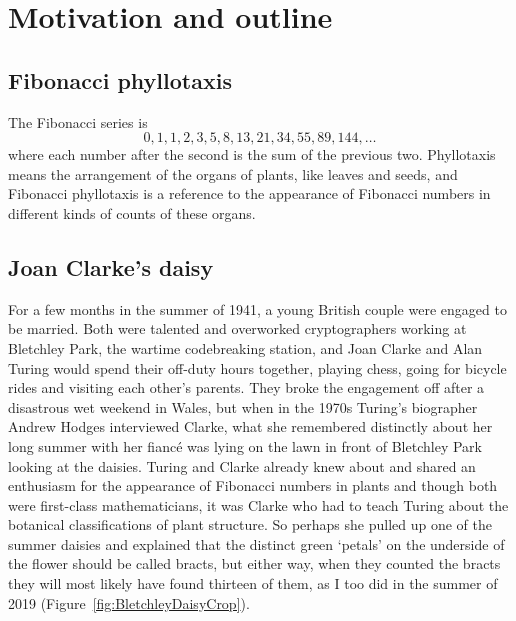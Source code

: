 
\chapter{Motivation and outline}
\section{Fibonacci phyllotaxis}
The Fibonacci series is
\[
0, 1, 1, 2, 3, 5,8, 13, 21, 34, 55, 89, 144, \dots
\] where each number after the second is the sum of the previous two. Phyllotaxis means the arrangement of the organs of plants, like leaves and seeds,  and Fibonacci phyllotaxis is a reference to the appearance of Fibonacci numbers in different kinds of counts of these organs. 
 
\section{Joan Clarke's daisy}

%
 For a few months in the summer of 1941, a young British couple were engaged to be married. Both were talented and overworked cryptographers working at Bletchley Park, the wartime codebreaking station, and  
 Joan Clarke and Alan Turing would spend their off-duty hours together, playing chess,  going for bicycle rides and visiting each other's parents. They broke the engagement off after a disastrous wet weekend in Wales, but when in the 1970s Turing's biographer Andrew Hodges interviewed Clarke, what she remembered distinctly about her long summer with her fianc\'e was lying on the lawn in front of Bletchley Park looking at the daisies. Turing and Clarke already knew about and shared an enthusiasm for the appearance of Fibonacci numbers in plants and though both were first-class mathematicians, it was Clarke who had to teach Turing about the botanical classifications of plant structure. So perhaps she  pulled up one of the summer daisies and explained that the distinct green `petals' on the underside of the flower should be called bracts, but either way, when they counted the bracts they will  most likely have found thirteen of them, as I too did in the summer of 2019 (Figure~\ref{fig:BletchleyDaisyCrop}).

